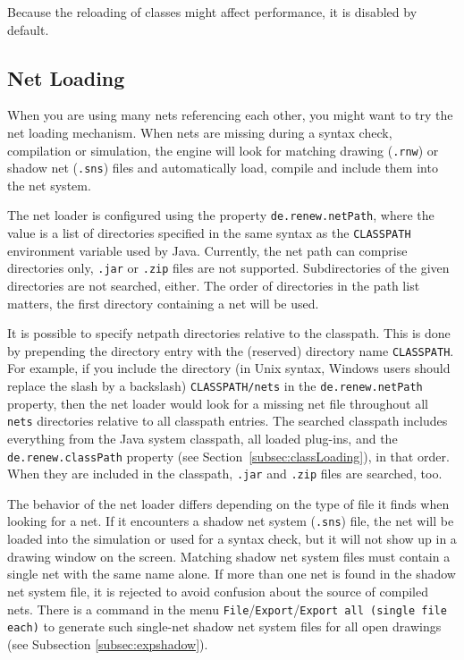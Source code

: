 Because the reloading of classes might affect performance,
it is disabled by default.


\subsection{Net Loading}\label{subsec:netLoading}

When you are using many nets referencing each other,
you might want to try the net loading mechanism. When nets
are missing during a syntax check, compilation or simulation,
the engine will look for matching drawing (\texttt{.rnw}) or
shadow net (\texttt{.sns}) files and automatically load,
compile and include them into the net system.

The net loader is configured using the property 
\texttt{de.renew.netPath},
where the value is a list of directories specified in
the same syntax as the \texttt{CLASSPATH} environment variable
used by Java. Currently, the net path can comprise directories 
only, \texttt{.jar} or \texttt{.zip} files are not
supported. Subdirectories of the given directories are not
searched, either. The order of directories in the path list
matters, the first directory containing a net will be used.

It is possible to specify netpath directories
relative to the classpath.
This is done by prepending the directory entry with the (reserved)
directory name \texttt{CLASSPATH}.
For example, if you include the directory (in Unix syntax, Windows
users should replace the slash by a backslash)
\texttt{CLASSPATH/nets}
in the \texttt{de.renew.netPath} property, then the 
net loader would look for a missing net file throughout all
\texttt{nets} directories relative to all classpath entries.
The searched classpath includes everything from the Java system
classpath, all loaded plug-ins, and the \texttt{de.renew.classPath}
property (see Section~\ref{subsec:classLoading}), in that order.
When they are included in the classpath, \texttt{.jar} and
\texttt{.zip} files are searched, too.

The behavior of the net loader differs depending on the type of
file it finds when looking for a net. If it encounters a shadow
net system (\texttt{.sns}) file, the net will be loaded into the
simulation or used for a syntax check, but it will not show up in
a drawing window on the screen.
Matching shadow net system files must contain a single net with the same
name alone.
If more than one net is found in the shadow net system file, it is rejected
to avoid confusion about the source of compiled nets.  
There is a command in the menu \texttt{File}/\texttt{Export}/\texttt{Export
  all (single file each)} to generate such single-net shadow net system
files for all open drawings (see Subsection \ref{subsec:expshadow}).

